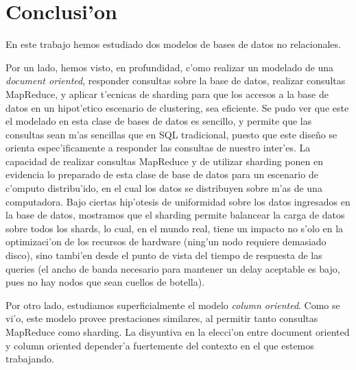 \section{Conclusi'on}

En este trabajo hemos estudiado dos modelos de bases de datos no relacionales.

Por un lado, hemos visto, en profundidad, c'omo realizar un modelado de una \textit{document oriented}, responder consultas sobre la base de datos, realizar consultas MapReduce, y aplicar t'ecnicas de sharding para que los accesos a la base de datos en un hipot'etico escenario de clustering, sea eficiente. Se pudo ver que este el modelado en esta clase de bases de datos es sencillo, y permite que las consultas sean m'as sencillas que en SQL tradicional, puesto que este dise\~no se orienta espec'ificamente a responder las consultas de nuestro inter'es. La capacidad de realizar consultas MapReduce y de utilizar sharding ponen en evidencia lo preparado de esta clase de base de datos para un escenario de c'omputo distribu'ido, en el cual los datos se distribuyen sobre m'as de una computadora. Bajo ciertas hip'otesis de uniformidad sobre los datos ingresados en la base de datos, mostramos que el sharding permite balancear la carga de datos sobre todos los shards, lo cual, en el mundo real, tiene un impacto no s'olo en la optimizaci'on de los recursos de hardware (ning'un nodo requiere demasiado disco), sino tambi'en desde el punto de vista del tiempo de respuesta de las queries (el ancho de banda necesario para mantener un delay aceptable es bajo, pues no hay nodos que sean cuellos de botella).

Por otro lado, estudiamos superficialmente el modelo \textit{column oriented}. Como se vi'o, este modelo provee prestaciones similares, al permitir tanto consultas MapReduce como sharding. La disyuntiva en la elecci'on entre document oriented y column oriented depender'a fuertemente del contexto en el que estemos trabajando.